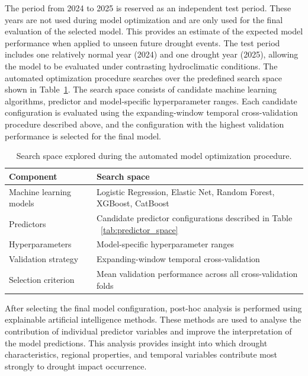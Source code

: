 The period from 2024 to 2025 is reserved as an independent test period. These years are not used during model optimization and are only used for the final evaluation of the selected model. This provides an estimate of the expected model performance when applied to unseen future drought events. The test period includes one relatively normal year (2024) and one drought year (2025), allowing the model to be evaluated under contrasting hydroclimatic conditions.
The automated optimization procedure searches over the predefined search space shown in Table~\ref{tab:search_space}. The search space consists of candidate machine learning algorithms, predictor and model-specific hyperparameter ranges. Each candidate configuration is evaluated using the expanding-window temporal cross-validation procedure described above, and the configuration with the highest validation performance is selected for the final model.

\begin{table}[h]
\centering
\caption{Search space explored during the automated model optimization procedure.}
\label{tab:search_space}
\begin{tabular}{p{4cm} p{10cm}}
\toprule
\textbf{Component} & \textbf{Search space} \\
\midrule
Machine learning models &
Logistic Regression, Elastic Net, Random Forest, XGBoost, CatBoost \\

Predictors  &
Candidate predictor configurations described in Table ~\ref{tab:predictor_space} \\

Hyperparameters &
Model-specific hyperparameter ranges \\

Validation strategy &
Expanding-window temporal cross-validation \\

Selection criterion &
Mean validation performance across all cross-validation folds \\
\bottomrule
\end{tabular}
\end{table}

After selecting the final model configuration, post-hoc analysis is performed using explainable artificial intelligence methods. These methods are used to analyse the contribution of individual predictor variables and improve the interpretation of the model predictions. This analysis provides insight into which drought characteristics, regional properties, and temporal variables contribute most strongly to drought impact occurrence.

